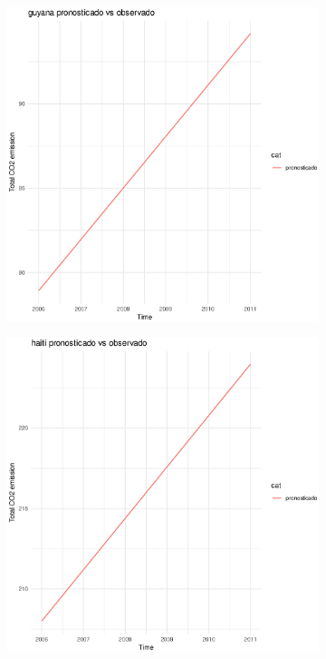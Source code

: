 \documentclass[twocolumn]{article}
\begin{document}
\begin{figure}
                \begin{subfigure}{.3\textwidth}
            \includegraphics[width=\linewidth]{images/guyana_imputation.eps}
        \end{subfigure}
        \hspace*{\fill}
        \begin{subfigure}{.3\textwidth}
            \includegraphics[width=\linewidth]{images/haiti_imputation.eps}

\end{subfigure}
\end{figure}
\end{document}
